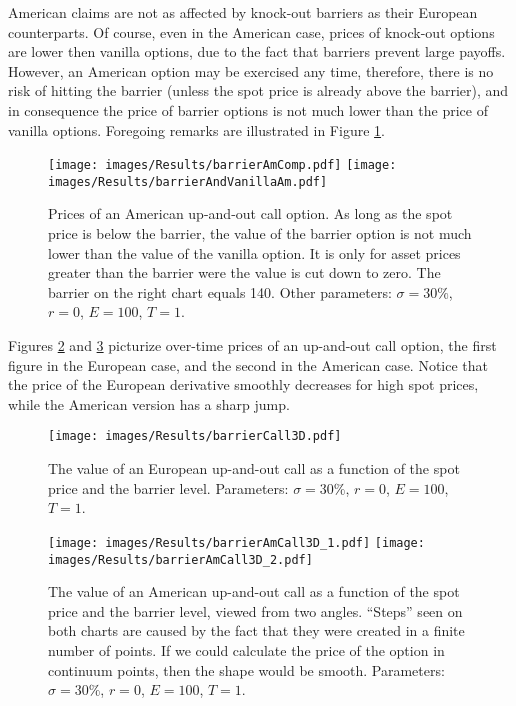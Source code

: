 \documentclass[a4paper,11pt, twoside]{book}
\theoremstyle{definition}
\theoremstyle{remark}
\begin{document}
American claims are not as affected by knock-out barriers as their European counterparts. Of course, even in the American case, prices of knock-out options are lower then vanilla options, due to the fact that barriers prevent large payoffs. However, an American option may be exercised any time, therefore, there is no risk of hitting the barrier (unless the spot price is already above the barrier), and in consequence the price of barrier options is not much lower than the price of vanilla options. Foregoing remarks are illustrated in Figure \ref{fig:results:barrierAm}.
\begin{figure}[!ht]
\centering
 \texttt{[image: images/Results/barrierAmComp.pdf]}
 \texttt{[image: images/Results/barrierAndVanillaAm.pdf]}
\caption{Prices of an American up-and-out call option. As long as the spot price is below the barrier, the value of the barrier option is not much lower than the value of the vanilla option. It is only for asset prices greater than the barrier were the value is cut down to zero. The barrier on the right chart equals 140. Other parameters: $\sigma = 30\%$, $r=0$, $E=100$, $T=1$.}
\label{fig:results:barrierAm}
\end{figure}

Figures \ref{fig:results:barrierEuCall3D} and \ref{fig:results:barrierAmCall3D} picturize over-time prices of an up-and-out call option, the first figure in the European case, and the second in the American case. Notice that the price of the European derivative smoothly decreases for high spot prices, while the American version has a sharp jump.

\begin{figure}[!ht]
\centering
 \texttt{[image: images/Results/barrierCall3D.pdf]}
\caption{The value of an European up-and-out call as a function of the spot price and the barrier level. Parameters: $\sigma = 30\%$, $r=0$, $E=100$, $T=1$.}
\label{fig:results:barrierEuCall3D}
\end{figure}
\begin{figure}[!ht]
\centering
 \texttt{[image: images/Results/barrierAmCall3D\_1.pdf]}
 \texttt{[image: images/Results/barrierAmCall3D\_2.pdf]}
\caption{The value of an American up-and-out call as a function of the spot price and the barrier level, viewed from two angles. ``Steps'' seen on both charts are caused by the fact that they were created in a finite number of points. If we could calculate the price of the option in continuum points, then the shape would be smooth. Parameters: $\sigma = 30\%$, $r=0$, $E=100$, $T=1$.}
\label{fig:results:barrierAmCall3D}
\end{figure}
\end{document}
